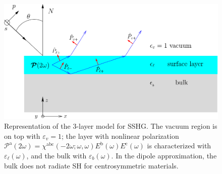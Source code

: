 \begin{figure}
\centering 
\includegraphics[scale=.5]{figures/diag-3layer}
\caption{Representation of the 3-layer model for SSHG. The vacuum region is on
top with $\varepsilon_{v}=1$; the layer with nonlinear polarization
$\mathcal{P}^{\mathrm{a}}(2\omega) = \chi^{\mathrm{abc}}(-2\omega;\omega,\omega)
E^{\mathrm{b}}(\omega)E^{\mathrm{c}}(\omega)$ is characterized with
$\varepsilon_{\ell}(\omega)$, and the bulk with $\varepsilon_{b}(\omega)$. In
the dipole approximation, the bulk does not radiate SH for centrosymmetric
materials.}
\label{fig:3layer}
\end{figure}


